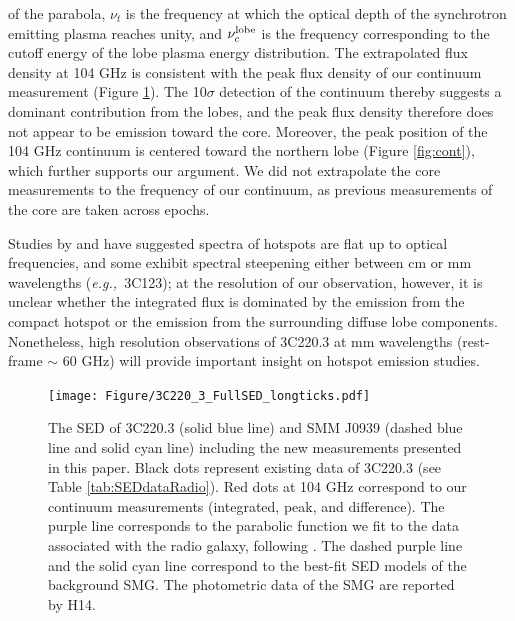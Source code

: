 \documentclass[twocolumn,apj,numberedappendix]{emulateapj}
\newcommand{\eg}{{\sl e.g.,~}}
\begin{document}
of the parabola, $\nu_t$ is the frequency at which the optical depth of the synchrotron emitting plasma reaches 
unity, and $\nu_c^{\rm lobe}$ is the frequency corresponding to the cutoff energy of the lobe plasma energy 
distribution. 
The extrapolated flux density at 104 GHz is consistent with the peak flux density of our continuum 
measurement (Figure \ref{fig:SED}). The 10$\sigma$ detection of the continuum thereby suggests
a dominant contribution from the lobes, and the peak flux density therefore does not appear to be emission toward 
the core. Moreover, the peak position of the 104 GHz continuum is
centered toward the northern lobe (Figure \ref{fig:cont}), which further supports our argument. We did not 
extrapolate the core measurements to the frequency of our continuum, as previous measurements of the core are 
taken 
across epochs.\par
Studies by \citet{Meisenheimer89a} and \citet{Hardcastle08a} have suggested spectra of hotspots are flat up to optical frequencies, and some exhibit spectral steepening either between cm or mm wavelengths (\eg 3C123); at the resolution of our observation, however, it is unclear whether the integrated flux is dominated by the emission from the compact hotspot or the emission from the surrounding diffuse lobe components. Nonetheless, high resolution observations of 3C220.3 at mm wavelengths (rest-frame $\sim$ 60 GHz) will provide important insight on hotspot emission studies. 

\begin{figure}[!tbph]
\centering
\texttt{[image: Figure/3C220\_3\_FullSED\_longticks.pdf]}
\caption{The SED of 3C220.3 (solid blue line) and SMM J0939 (dashed blue line and solid cyan line) including the new measurements presented in this paper. 
Black dots represent existing data of 3C220.3 (see Table \ref{tab:SEDdataRadio}). Red dots at 104 GHz correspond to 
our continuum measurements (integrated, peak, and difference). The purple line corresponds to the parabolic function we 
fit to the data associated with the radio galaxy, following \citet{Cleary07a}. The dashed purple line and 
the solid cyan line correspond to the best-fit SED models of the background SMG. The photometric data of the SMG are reported by H14. \label{fig:SED}}
\end{figure}
\end{document}
